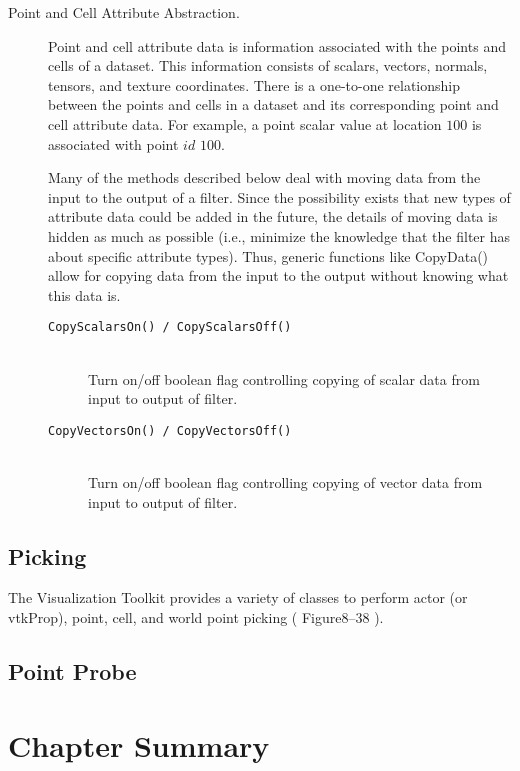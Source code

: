 \begin{description}
\item[Point and Cell Attribute Abstraction.] Point and cell attribute data is information associated with the points and cells of a dataset. This information consists of scalars, vectors, normals, tensors, and texture coordinates. There is a one-to-one relationship between the points and cells in a dataset and its corresponding point and cell attribute data. For example, a point scalar value at location $100$ is associated with point $id$ $100$.

Many of the methods described below deal with moving data from the input to the output of a filter. Since the possibility exists that new types of attribute data could be added in the future, the details of moving data is hidden as much as possible (i.e., minimize the knowledge that the filter has about specific attribute types). Thus, generic functions like CopyData() allow for copying data from the input to the output without knowing what this data is.
    \begin{description}
    \item[\texttt{CopyScalarsOn() / CopyScalarsOff()}] \hfill \\
    Turn on/off boolean flag controlling copying of scalar data from input to output of filter.
    \item[\texttt{CopyVectorsOn() / CopyVectorsOff()}] \hfill \\
    Turn on/off boolean flag controlling copying of vector data from input to output of filter.
    \end{description}

\end{description}


\subsection{Picking}
\label{subsec:picking}

The Visualization Toolkit provides a variety of classes to perform actor (or vtkProp), point, cell, and
world point picking ( Figure8–38 ).

\subsection{Point Probe}
\label{subsec:point_probe}

\section{Chapter Summary}


